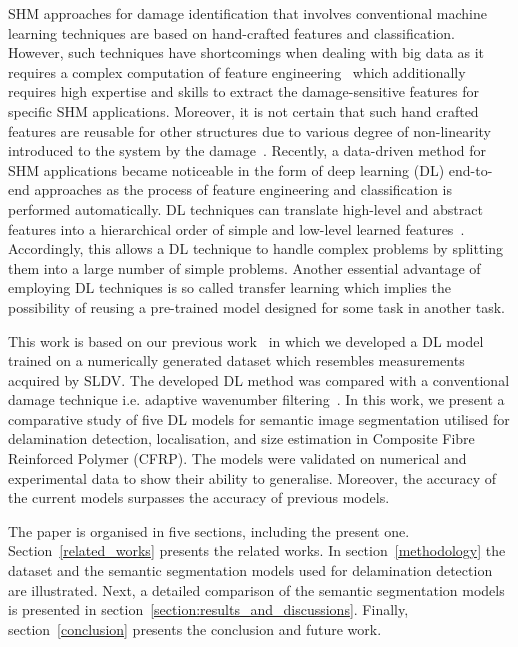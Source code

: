 SHM approaches for damage identification that involves conventional machine learning techniques are based on hand-crafted features and classification.
However, such techniques have shortcomings when dealing with big data as it requires a complex computation of feature engineering~\cite{Gulgec2019} which additionally requires high expertise and skills to extract the damage-sensitive features for specific SHM applications.
Moreover, it is not certain that such hand crafted features are reusable for
other structures due to various degree of non-linearity introduced to the system by the damage~\cite{Adams2002}.
Recently, a data-driven method for SHM applications became noticeable in the form of deep learning (DL) end-to-end approaches as the process of feature engineering and classification is performed automatically.
DL techniques can translate high-level and abstract features into a hierarchical order of simple and low-level learned features~\cite{Goodfellow-et-al-2016}.
Accordingly, this allows a DL technique to handle complex problems by splitting them into a large number of simple problems.
Another essential advantage of employing DL techniques is so called transfer learning which implies the possibility of reusing a pre-trained model designed for some task in another task.

This work is based on our previous work~\cite{Ijjeh2021} in which we developed a DL model trained on a numerically generated dataset which resembles measurements acquired by SLDV.
The developed DL method was compared with a conventional damage technique i.e. adaptive wavenumber filtering~\cite{Kudela2015, Radzienski2019a}.
In this work, we present a comparative study of five DL models for semantic image segmentation utilised for delamination detection, localisation, and size estimation in Composite Fibre Reinforced Polymer (CFRP).
The models were validated on numerical and experimental data to show their ability to generalise.
Moreover, the accuracy of the current models surpasses the accuracy of previous models.         

The paper is organised in five sections, including the present one.
Section~\ref{related_works} presents the related works.
In section~\ref{methodology} the dataset and the semantic segmentation models used for delamination detection are illustrated. 
Next, a detailed comparison of the semantic segmentation models is presented in section~\ref{section:results_and_discussions}.
Finally, section~\ref{conclusion} presents the conclusion and future work.